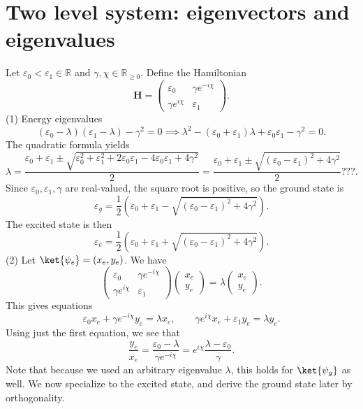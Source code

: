 \documentclass[11pt, letterpaper]{article}
\begin{document}
\section{Two level system: eigenvectors and eigenvalues}
Let $\varepsilon _0<\varepsilon _1\in \mathbb{R} $ and $\gamma ,\chi \in \mathbb{R}_{\geq 0} $. Define the Hamiltonian
\[
	\mathbf{H}=\begin{pmatrix}
	\varepsilon _0 & \gamma e^{-i\chi }  \\
	\gamma e^{i\chi }  & \varepsilon _1
	\end{pmatrix}
.\]
(1) Energy eigenvalues
\[
	(\varepsilon _0-\lambda )(\varepsilon _1-\lambda )-\gamma ^2=0 \implies \lambda ^2-(\varepsilon _0+\varepsilon _1)\lambda +\varepsilon _0\varepsilon _1-\gamma ^2=0
.\]
The quadratic formula yields
\[
	\lambda = \frac{\varepsilon _0+\varepsilon _1\pm \sqrt{\varepsilon _0^2+\varepsilon _1^2+2\varepsilon _0\varepsilon _1-4\varepsilon _0\varepsilon _1+4\gamma ^2} }{2} =\frac{\varepsilon _0+\varepsilon _1\pm \sqrt{(\varepsilon _0-\varepsilon _1)^2+4\gamma ^2} }{2} ???
.\]
Since $\varepsilon _0,\varepsilon _1,\gamma $ are real-valued, the square root is positive, so the ground state is
\[
	\varepsilon_g=\frac{1}{2} \left( \varepsilon _0+\varepsilon _1-\sqrt{(\varepsilon _0-\varepsilon _1)^2+4\gamma ^2}  \right) 
.\]
The excited state is then
\[
	\varepsilon_e=\frac{1}{2} \left( \varepsilon _0+\varepsilon _1+\sqrt{(\varepsilon _0-\varepsilon _1)^2+4\gamma ^2}  \right) 
.\]
(2) Let $\ket{\psi _e}=(x_e,y_e)$. We have
\[
	\begin{pmatrix}
	\varepsilon _0 & \gamma e^{-i\chi }  \\
	\gamma e^{i\chi }  & \varepsilon _1
	\end{pmatrix}\begin{pmatrix}
	x_e \\
	y_e
	\end{pmatrix}=\lambda \begin{pmatrix}
	x_e \\
	y_e
	\end{pmatrix}
.\]
This gives equations
\[
	\varepsilon _0x_e+\gamma e^{-i\chi } y_e=\lambda x_e,\qquad \gamma e^{i\chi } x_e+\varepsilon _1y_e=\lambda y_e
.\]
Using just the first equation, we see that
\[
	\frac{y_e}{x_e} =\frac{\varepsilon _0-\lambda }{\gamma e^{-i\chi } } =e^{i\chi } \frac{\lambda -\varepsilon _0}{\gamma } 
.\]
Note that because we used an arbitrary eigenvalue $\lambda $, this holds for $\ket{\psi _g}$ as well. We now specialize to the excited state, and derive the ground state later by orthogonality.
\end{document}
